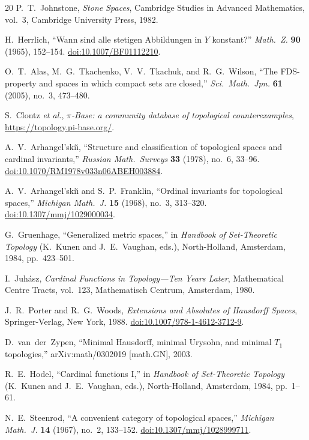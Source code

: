 \documentclass[11pt]{article}
\theoremstyle{definition}
\theoremstyle{remark}
\begin{document}
\begin{thebibliography}{20}
P.~T.~Johnstone,
\emph{Stone Spaces},
Cambridge Studies in Advanced Mathematics, vol.~3, Cambridge University Press, 1982.

H.~Herrlich,
``Wann sind alle stetigen Abbildungen in $Y$ konstant?''
\textit{Math.\ Z.} \textbf{90} (1965), 152--154.
\href{https://doi.org/10.1007/BF01112210}{doi:10.1007/BF01112210}.

O.~T.~Alas, M.~G.~Tkachenko, V.~V.~Tkachuk, and R.~G.~Wilson,
``The FDS-property and spaces in which compact sets are closed,''
\textit{Sci.\ Math.\ Jpn.} \textbf{61} (2005), no.~3, 473--480.

S.~Clontz \textit{et al.},
\emph{$\pi$-Base: a community database of topological counterexamples},
\url{https://topology.pi-base.org/}.

A.~V.~Arhangel'ski\u{\i},
``Structure and classification of topological spaces and cardinal
invariants,''
\textit{Russian Math.\ Surveys} \textbf{33} (1978), no.~6, 33--96.
\href{https://doi.org/10.1070/RM1978v033n06ABEH003884}{doi:10.1070/RM1978v033n06ABEH003884}.

A.~V.~Arhangel'ski\u{\i} and S.~P.~Franklin,
``Ordinal invariants for topological spaces,''
\textit{Michigan Math.\ J.} \textbf{15} (1968), no.~3, 313--320.
\href{https://doi.org/10.1307/mmj/1029000034}{doi:10.1307/mmj/1029000034}.

G.~Gruenhage,
``Generalized metric spaces,''
in \emph{Handbook of Set-Theoretic Topology}
(K.~Kunen and J.~E.~Vaughan, eds.), North-Holland, Amsterdam, 1984,
pp.~423--501.

I.~Juh\'{a}sz,
\emph{Cardinal Functions in Topology---Ten Years Later},
Mathematical Centre Tracts, vol.~123, Mathematisch Centrum,
Amsterdam, 1980.

J.~R.~Porter and R.~G.~Woods,
\emph{Extensions and Absolutes of Hausdorff Spaces},
Springer-Verlag, New York, 1988.
\href{https://doi.org/10.1007/978-1-4612-3712-9}{doi:10.1007/978-1-4612-3712-9}.

D.~van~der~Zypen,
``Minimal Hausdorff, minimal Urysohn, and minimal $T_1$ topologies,''
arXiv:math/0302019 [math.GN], 2003.

R.~E.~Hodel,
``Cardinal functions I,''
in \emph{Handbook of Set-Theoretic Topology}
(K.~Kunen and J.~E.~Vaughan, eds.), North-Holland, Amsterdam, 1984,
pp.~1--61.

N.~E.~Steenrod,
``A convenient category of topological spaces,''
\textit{Michigan Math.\ J.} \textbf{14} (1967), no.~2, 133--152.
\href{https://doi.org/10.1307/mmj/1028999711}{doi:10.1307/mmj/1028999711}.

\end{thebibliography}
\end{document}

